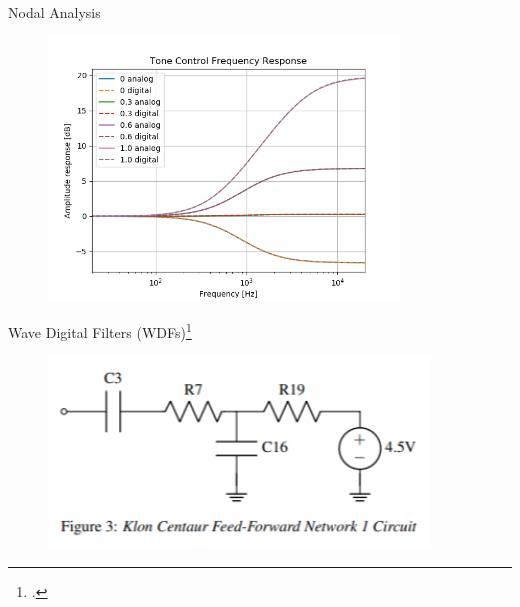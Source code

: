 \begin{frame}{Nodal Analysis}
    \begin{figure}
        \centering
        \includegraphics[height=2.75in]{../Paper/Figures/ToneFreq.png}
    \end{figure}
\end{frame}

\begin{frame}{Wave Digital Filters (WDFs)\footcite{Fettweis,KurtThesis}}
    \begin{figure}
        \centering
        \includegraphics[height=2.0in]{Figures/FF1.png}
    \end{figure}
\end{frame}

